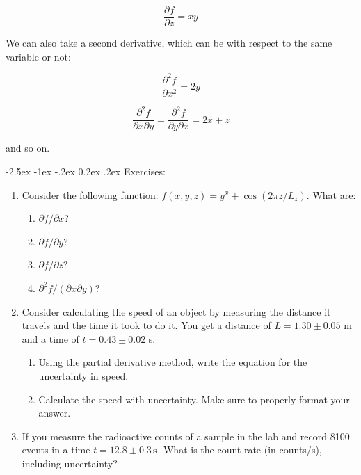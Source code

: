 \documentclass[11pt]{article}
\makeatletter
\renewcommand\u[2][]{\ensuremath{\,\text{#2}^{#1}}}
\renewcommand\subsection{\@startsection {subsection}{2}{\z@}%
     {-2.5ex \@plus -1ex \@minus -.2ex}%
     {0.2ex \@plus.2ex}%
    {\bfseries\large}}
\makeatother
\begin{document}
\begin{equation}
  \frac{\partial f}{\partial z} = xy
\end{equation}

We can also take a second derivative, which can be with respect to the same variable or not:

\begin{equation}
  \frac{\partial^2 f}{\partial x^2} = 2y
\end{equation}

\begin{equation}
  \frac{\partial^2 f}{\partial x \partial y} = \frac{\partial^2 f}{\partial y \partial x}
  = 2x+z
\end{equation}

and so on.

\subsection{Exercises:}

\begin{enumerate}[resume]

\item Consider the following function: $f(x, y, z) = y^x + \cos(2\pi z/L_z)$.
  What are:
  \begin{enumerate}
  \item $\partial f/\partial x$?
  \item $\partial f/\partial y$?
  \item $\partial f/\partial z$?
  \item $\partial^2 f/(\partial x\partial y)$?
  \end{enumerate}

\item Consider calculating the speed of an object by measuring the distance it
  travels and the time it took to do it. You get a distance of $L = 1.30 \pm
  0.05$ m and a time of $t = 0.43 \pm 0.02$ s.
  \begin{enumerate}
  \item Using the partial derivative method, write the equation for the
    uncertainty in speed.
  \item Calculate the speed with uncertainty. Make sure to properly format
    your answer.
  \end{enumerate}

\item If you measure the radioactive counts of a sample in the lab and record
  8100 events in a time $t = 12.8 \pm 0.3\u{s}$. What is the count rate (in counts/s), including
  uncertainty? 
\end{enumerate}
\end{document}
